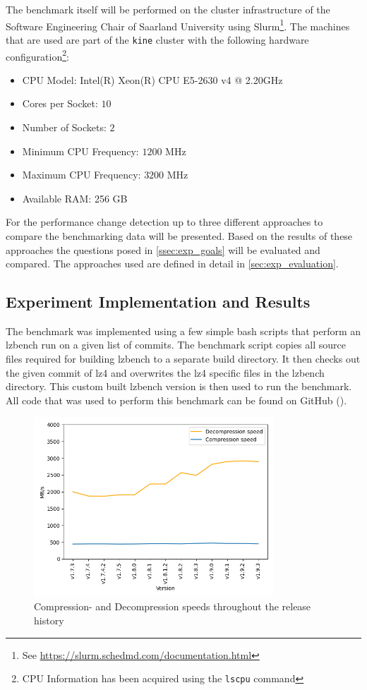 \documentclass[	runningheads,
				a4paper]{llncs}
\begin{document}
The benchmark itself will be performed on the cluster infrastructure of the Software Engineering Chair of Saarland University using Slurm\footnote{See \url{https://slurm.schedmd.com/documentation.html}}. The machines that are used are part of the \texttt{kine} cluster with the following hardware configuration\footnote{CPU Information has been acquired using the \texttt{lscpu} command}:

\begin{itemize}
	\item CPU Model: Intel(R) Xeon(R) CPU E5-2630 v4 @ 2.20GHz
	\item Cores per Socket: $10$
	\item Number of Sockets: $2$
	\item Minimum CPU Frequency: $1200$ MHz
	\item Maximum CPU Frequency: $3200$ MHz
	\item Available RAM: 256 GB
\end{itemize}

For the performance change detection up to three different approaches to compare the benchmarking data will be presented. Based on the results of these approaches the questions posed in \autoref{ssec:exp_goals} will be evaluated and compared. The approaches used are defined in detail in \autoref{sec:exp_evaluation}.

	\subsection{Experiment Implementation and Results}

	The benchmark was implemented using a few simple bash scripts that perform an lzbench run on a given list of commits. The benchmark script copies all source files required for building lzbench to a separate build directory. It then checks out the given commit of lz4 and overwrites the lz4 specific files in the lzbench directory. This custom built lzbench version is then used to run the benchmark. All code that was used to perform this benchmark can be found on GitHub (\cite{gitSysBench}).

	\begin{figure}[ht!]
		\centering
		\includegraphics[width=0.8\textwidth]{graph/lz4_releases_plot}
		\caption{Compression- and Decompression speeds throughout the release history}
		\label{fig:release-bench}
	\end{figure}
\end{document}
